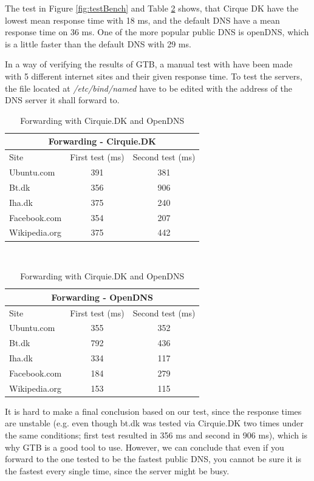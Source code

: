 \documentclass[Preamble]{subfiles}
\begin{document}
The test in Figure \ref{fig:testBench} and Table \ref{tab:Forwarding} shows, that Cirque DK have the lowest mean response time with 18 ms, and the default DNS have a mean response time on 36 ms. 
One of the more popular public DNS is openDNS, which is a little faster than the default DNS with 29 ms. 

In a way of verifying the results of GTB, a manual test with  have been made with 5 different internet sites and their given response time. 
To test the servers, the file located at \textit{/etc/bind/named} have to be edited with the address of the DNS server it shall forward to. 

\begin{table}[H]

\begin{center}
  \begin{tabular}{l|c|c}
    \multicolumn{3}{c}{Forwarding - Cirquie.DK}  \\
	\hline Site & First test (ms) & Second test (ms) \\ \hline
    Ubuntu.com & 391 & 381  \\ %
    Bt.dk & 356 & 906  \\ %
	Iha.dk & 375 & 240 \\ %
	Facebook.com & 354 &	207 \\ %
	Wikipedia.org & 375 & 442 \\ \hline
  \end{tabular}
\end{center}
~\\
\begin{center}
  \begin{tabular}{l|c|c}
    \multicolumn{3}{c}{Forwarding - OpenDNS}  \\
	\hline Site & First test (ms) & Second test (ms) \\     
    \hline
    Ubuntu.com & 355 & 352  \\ %
    Bt.dk & 792 & 436  \\ %
	Iha.dk & 334 & 117 \\ %
	Facebook.com & 184 & 279 \\ %
	Wikipedia.org & 153 & 115 \\ \hline
  \end{tabular}
\end{center}
\caption{Forwarding with Cirquie.DK and OpenDNS}
\label{tab:Forwarding}
\end{table}


It is hard to make a final conclusion based on our test, since the response times are unstable (e.g. even though bt.dk was tested via Cirquie.DK two times under the same conditions; first test resulted in 356 ms and second in 906 ms), which is why GTB is a good tool to use. 
However, we can conclude that even if you forward to the one tested to be the fastest public DNS, you cannot be sure it is the fastest every single time, since the server might be busy.
\end{document}
